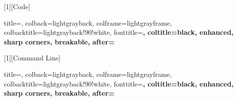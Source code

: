 [1][Code]{%
  title=,
  colback=lightgrayback,
  colframe=lightgrayframe,
  colbacktitle=lightgrayback!90!white,
  fonttitle=\bfseries,
  coltitle=black,
  enhanced, sharp corners, breakable,
  after=\par\vspace{6pt}
}

[1][Command Line]{%
  title=,
  colback=lightgrayback,
  colframe=lightgrayframe,
  colbacktitle=lightgrayback!90!white,
  fonttitle=\bfseries,
  coltitle=black,
  enhanced, sharp corners, breakable,
  after=\par\vspace{6pt}
}

\usepackage{xurl}

\usepackage{fancyhdr}
\setlength{\headheight}{15pt}


\pagestyle{fancy}
\fancyhf{}

\fancyhead[C]{\leftmark}        %

\rfoot{\thepage}                %

\renewcommand{\headrulewidth}{0pt}   %
\renewcommand{\footrulewidth}{0pt}     %
